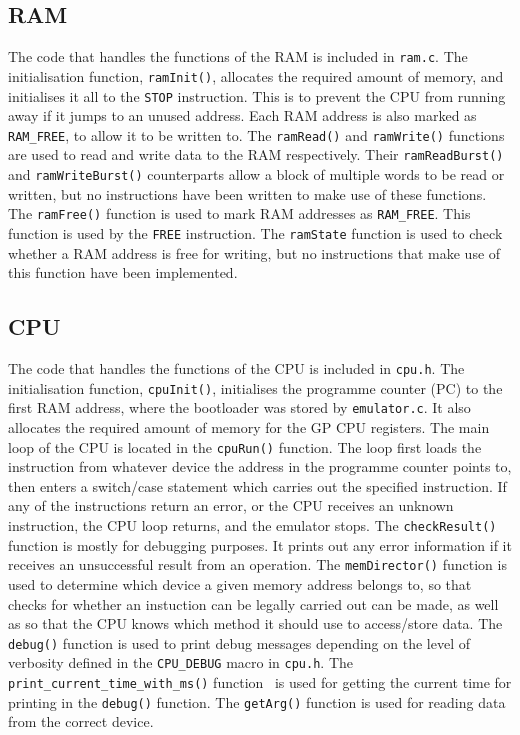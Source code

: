 \documentclass[a4paper,11pt]{article}
\begin{document}
    \subsection{RAM}
        The code that handles the functions of the RAM is included in \lstinline{ram.c}. The initialisation function, \lstinline{ramInit()}, allocates the required amount of memory, and initialises it all to the \lstinline{STOP} instruction. This is to prevent the CPU from running away if it jumps to an unused address. Each RAM address is also marked as \lstinline{RAM_FREE}, to allow it to be written to. The \lstinline{ramRead()} and \lstinline{ramWrite()} functions are used to read and write data to the RAM respectively. Their \lstinline{ramReadBurst()} and \lstinline{ramWriteBurst()} counterparts allow a block of multiple words to be read or written, but no instructions have been written to make use of these functions. The \lstinline{ramFree()} function is used to mark RAM addresses as \lstinline{RAM_FREE}. This function is used by the \lstinline{FREE} instruction. The \lstinline{ramState} function is used to check whether a RAM address is free for writing, but no instructions that make use of this function have been implemented.
    
    \subsection{CPU}
        The code that handles the functions of the CPU is included in \lstinline{cpu.h}. The initialisation function, \lstinline{cpuInit()}, initialises the programme counter (PC) to the first RAM address, where the bootloader was stored by \lstinline{emulator.c}. It also allocates the required amount of memory for the GP CPU registers. The main loop of the CPU is located in the \lstinline{cpuRun()} function. The loop first loads the instruction from whatever device the address in the programme counter points to, then enters a switch/case statement which carries out the specified instruction. If any of the instructions return an error, or the CPU receives an unknown instruction, the CPU loop returns, and the emulator stops. The \lstinline{checkResult()} function is mostly for debugging purposes. It prints out any error information if it receives an unsuccessful result from an operation. The \lstinline{memDirector()} function is used to determine which device a given memory address belongs to, so that checks for whether an instuction can be legally carried out can be made, as well as so that the CPU knows which method it should use to access/store data. The \lstinline{debug()} function is used to print debug messages depending on the level of verbosity defined in the \lstinline{CPU_DEBUG} macro in \lstinline{cpu.h}. The \lstinline{print_current_time_with_ms()} function~\cite{printCurrentTime} is used for getting the current time for printing in the \lstinline{debug()} function. The \lstinline{getArg()} function is used for reading data from the correct device.
    
\end{document}
